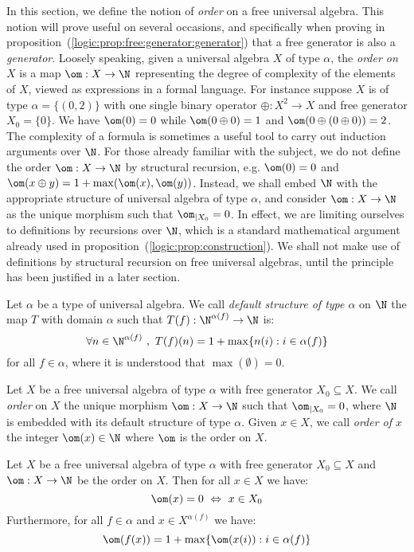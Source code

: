 In this section, we define the notion of {\em order} on a free
universal algebra. This notion will prove useful on several
occasions, and specifically when proving in
proposition~(\ref{logic:prop:free:generator:generator}) that a free
generator is also a {\em generator}. Loosely speaking, given a
universal algebra $X$ of type $\alpha$, the {\em order on $X$} is a
map $\om:X\to\N$ representing the degree of complexity of the
elements of $X$, viewed as expressions in a formal language. For
instance suppose $X$ is of type $\alpha=\{(0,2)\}$ with one single
binary operator $\oplus:X^{2}\to X$ and free generator
$X_{0}=\{0\}$. We have $\om(0)=0$ while $\om(0\oplus 0)=1$ and
$\om(0\oplus(0\oplus 0))=2$. The complexity of a formula is
sometimes a useful tool to carry out induction arguments over $\N$.
For those already familiar with the subject, we do not define the
order $\om:X\to\N$ by structural recursion, e.g. $\om(0)=0$ and
$\om(x\oplus y)=1+\max(\om(x),\om(y))$. Instead, we shall embed $\N$
with the appropriate structure of universal algebra of type
$\alpha$, and consider $\om:X\to\N$ as the unique morphism such that
$\om_{|X_{0}}=0$. In effect, we are limiting ourselves to
definitions by recursions over $\N$, which is a standard
mathematical argument already used in
proposition~(\ref{logic:prop:construction}). We shall not make use
of definitions by structural recursion on free universal algebras,
until the principle has been justified in a later section.
\begin{defin}\label{logic:def:default:structure}
Let $\alpha$ be a type of universal algebra. We call {\em default
structure of type $\alpha$} on $\N$ the map $T$ with domain $\alpha$
such that $T(f):\N^{\alpha(f)}\to\N$ is:
    \[
    \forall n\in\N^{\alpha(f)}\ ,\ T(f)(n)=1+\max\{n(i):i\in\alpha(f)\}
    \]
for all $f\in\alpha$, where it is understood that $\max(\emptyset)=0$.
\end{defin}
\begin{defin}\label{logic:def:order}
Let $X$ be a free universal algebra of type $\alpha$ with free
generator $X_{0}\subseteq X$. We call {\em order} on $X$ the unique
morphism $\om:X\to\N$ such that $\om_{|X_{0}}=0$, where $\N$ is
embedded with its default structure of type $\alpha$. Given $x\in
X$, we call {\em order of $x$} the integer $\om(x)\in\N$ where $\om$
is the order on $X$.
\end{defin}
\begin{prop}\label{logic:prop:order}
Let $X$ be a free universal algebra of type $\alpha$ with free
generator $X_{0}\subseteq X$ and $\om:X\to\N$ be the order on $X$.
Then for all $x\in X$ we have:
    \[
    \om(x)=0\ \Leftrightarrow\ x\in X_{0}
    \]
Furthermore, for all $f\in\alpha$ and $x\in X^{\alpha(f)}$ we have:
    \[
    \om(f(x)) = 1 + \max\{\om(x(i)):i\in\alpha(f)\}
    \]
\end{prop}
